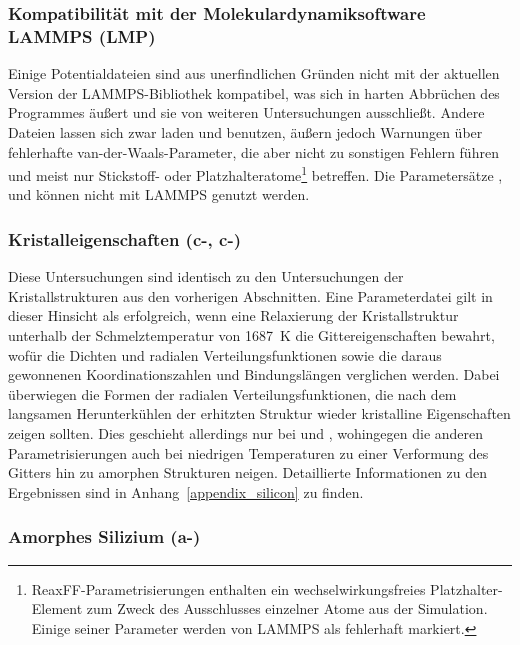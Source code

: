 \subsubsection{Kompatibilität mit der Molekulardynamiksoftware LAMMPS (LMP)}

Einige Potentialdateien sind aus unerfindlichen Gründen nicht mit der aktuellen Version der LAMMPS-Bibliothek kompatibel, was sich in harten Abbrüchen des Programmes äußert und sie von weiteren Untersuchungen ausschließt.
Andere Dateien lassen sich zwar laden und benutzen, äußern jedoch Warnungen über fehlerhafte van-der-Waals-Parameter, die aber nicht zu sonstigen Fehlern führen und meist nur Stickstoff- oder Platzhalteratome\footnote{ReaxFF-Parametrisierungen enthalten ein wechselwirkungsfreies Platzhalter-Element  zum Zweck des Ausschlusses einzelner Atome aus der Simulation. Einige seiner Parameter werden von LAMMPS als fehlerhaft markiert.} betreffen.
Die Parametersätze ,  und  können nicht mit LAMMPS genutzt werden.

\subsubsection{Kristalleigenschaften (c-, c-)}

Diese Untersuchungen sind identisch zu den Untersuchungen der Kristallstrukturen aus den vorherigen Abschnitten.
Eine Parameterdatei gilt in dieser Hinsicht als erfolgreich, wenn eine Relaxierung der Kristallstruktur unterhalb der Schmelztemperatur von \SI{1687}{\kelvin}\cite{haynes_crc_2011} die Gittereigenschaften bewahrt, wofür die Dichten und radialen Verteilungsfunktionen sowie die daraus gewonnenen Koordinationszahlen und Bindungslängen verglichen werden.
Dabei überwiegen die Formen der radialen Verteilungsfunktionen, die nach dem langsamen Herunterkühlen der erhitzten Struktur wieder kristalline Eigenschaften zeigen sollten.
Dies geschieht allerdings nur bei  und , wohingegen die anderen Parametrisierungen auch bei niedrigen Temperaturen zu einer Verformung des Gitters hin zu amorphen Strukturen neigen.
Detaillierte Informationen zu den Ergebnissen sind in Anhang~\ref{appendix_silicon} zu finden.

\subsubsection{Amorphes Silizium (a-)}


